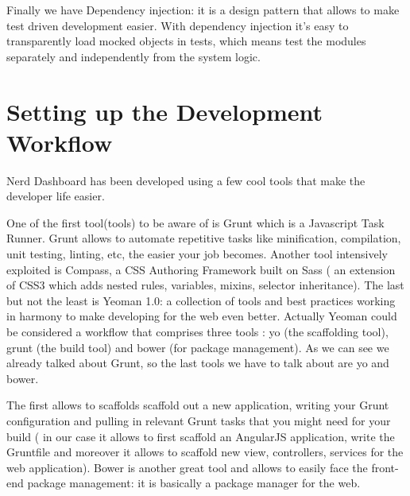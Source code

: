 \documentclass[a4paper,13pt]{report}
\begin{document}
Finally we have Dependency injection: it is a design pattern that allows to make test driven development easier. With dependency injection it's easy to transparently load mocked objects in tests, which means test the modules separately and independently from the system logic.

 \section{Setting up the Development Workflow}
 Nerd Dashboard has been developed using a few cool tools that make the developer life easier. 

One of the first tool(tools) to be aware of is Grunt which is a Javascript Task Runner. Grunt allows to automate repetitive tasks like minification, compilation, unit testing, linting, etc, the easier your job becomes.\newline
Another tool intensively exploited is Compass, a CSS Authoring Framework built on Sass ( an extension of CSS3 which adds nested rules, variables, mixins, selector inheritance).
The last but not the least is Yeoman 1.0: a collection of tools and best practices working in harmony to make developing for the web even better. Actually Yeoman could be considered a workflow that comprises three tools : yo (the scaffolding tool), grunt (the build tool) and bower (for package management). As we can see we already talked about Grunt, so the last tools we have to talk about are yo and bower.

The first allows to scaffolds scaffold out a new application, writing your Grunt configuration and pulling in relevant Grunt tasks that you might need for your build ( in our case it allows to first scaffold an AngularJS application, write the Gruntfile and moreover it allows to scaffold new view, controllers, services for the web application). Bower is another great tool and allows to easily face the front-end package management: it is basically a package manager for the web.
\end{document}

